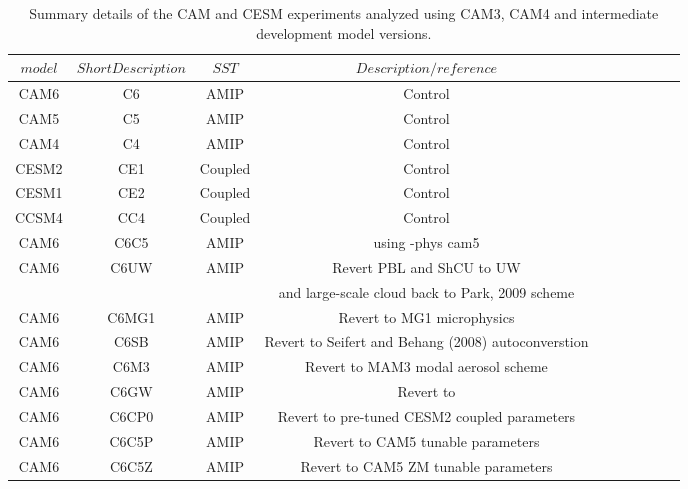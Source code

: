\begin{table}[t]
\caption{Summary details of the CAM and CESM experiments analyzed using CAM3, CAM4 and intermediate development model versions.}\label{t1}
\begin{center}
\begin{tabular}{cccccrrcrc}
\hline\hline
$model$ & $Short Description$ &$SST$ & $Description/reference$ \\
\hline
CAM6       & C6                        & AMIP     & Control  \\
CAM5       & C5                        & AMIP     & Control  \\
CAM4       & C4                        & AMIP     & Control  \\
CESM2      & CE1                       & Coupled  & Control  \\
CESM1      & CE2                       & Coupled  & Control  \\
CCSM4      & CC4                       & Coupled  & Control  \\
\hline
CAM6       & C6C5                      & AMIP     & using -phys cam5  \\
CAM6       & C6UW                      & AMIP     & Revert PBL and ShCU to UW \\
           &                           &          & and large-scale cloud back to Park, 2009 scheme    \\
CAM6       & C6MG1                     & AMIP     & Revert to MG1 microphysics  \\
CAM6       & C6SB                      & AMIP     & Revert to Seifert and Behang (2008) autoconverstion   \\
CAM6       & C6M3                      & AMIP     & Revert to MAM3 modal aerosol scheme  \\
CAM6       & C6GW                      & AMIP     & Revert to   \\
CAM6       & C6CP0                     & AMIP     & Revert to pre-tuned CESM2 coupled parameters  \\
CAM6       & C6C5P                  & AMIP     & Revert to CAM5 tunable parameters  \\
CAM6       & C6C5Z                  & AMIP     & Revert to CAM5 ZM tunable parameters  \\
\hline
\end{tabular}
\end{center}
\end{table}


